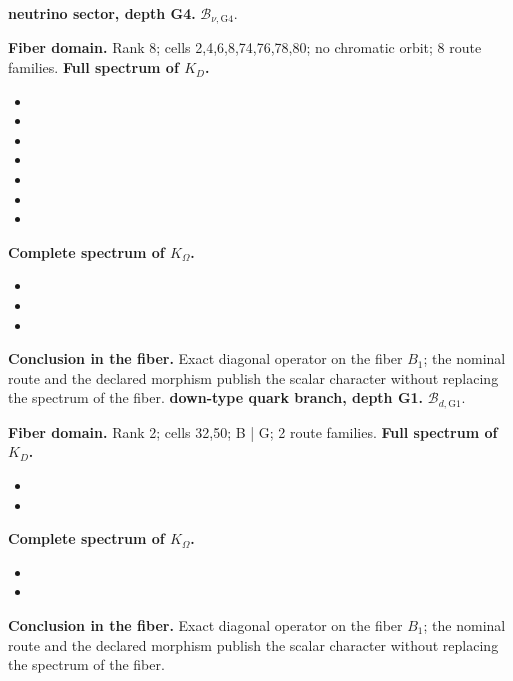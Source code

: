 \medskip
{}
\noindent\textbf{neutrino sector, depth G4.} \(\mathcal B_{\nu,\mathrm{G4}}\).\par
\noindent\textbf{Fiber domain.} Rank 8; cells 2,4,6,8,74,76,78,80; no chromatic orbit; 8 route families.
\noindent\textbf{Full spectrum of \(K_D\).}
\begin{itemize}
\item \texttt{}
\item \texttt{}
\item \texttt{}
\item \texttt{}
\item \texttt{}
\item \texttt{}
\item \texttt{}
\end{itemize}
\noindent\textbf{Complete spectrum of \(K_\Omega\).}
\begin{itemize}
\item \texttt{}
\item \texttt{}
\item \texttt{}
\end{itemize}
\noindent\textbf{Conclusion in the fiber.} Exact diagonal operator on the fiber \(B_1\); the nominal route and the declared morphism publish the scalar character without replacing the spectrum of the fiber.
\medskip
{}
\noindent\textbf{down-type quark branch, depth G1.} \(\mathcal B_{d,\mathrm{G1}}\).\par
\noindent\textbf{Fiber domain.} Rank 2; cells 32,50; B | G; 2 route families.
\noindent\textbf{Full spectrum of \(K_D\).}
\begin{itemize}
\item \texttt{}
\item \texttt{}
\end{itemize}
\noindent\textbf{Complete spectrum of \(K_\Omega\).}
\begin{itemize}
\item \texttt{}
\item \texttt{}
\end{itemize}
\noindent\textbf{Conclusion in the fiber.} Exact diagonal operator on the fiber \(B_1\); the nominal route and the declared morphism publish the scalar character without replacing the spectrum of the fiber.
